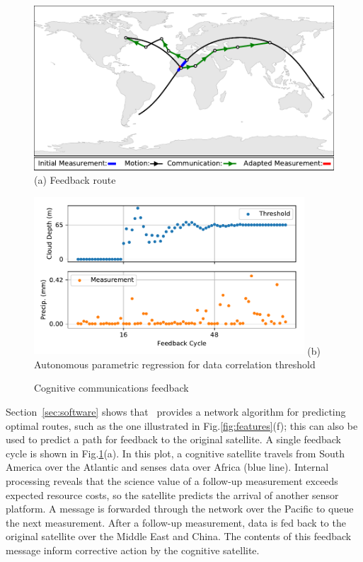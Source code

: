 \documentclass[conference]{IEEEtran}
\newcommand{\project}{{\sc{Collaborate}}~}
\begin{document}
\begin{figure}[b!]
  \begin{minipage}[b]{\linewidth}
    \begin{center}
      \includegraphics[width=\textwidth]{images/loop.pdf}
      {\footnotesize(a) Feedback route}
    \end{center}
  \end{minipage}
  \begin{minipage}[b]{\linewidth}
    \begin{center}
      \includegraphics[width=0.9\textwidth]{images/regression.pdf}
      {\footnotesize(b) Autonomous parametric regression for data correlation
        threshold}
    \end{center}
  \end{minipage}
  \caption{Cognitive communications feedback}
  \label{fig:feedback}
\end{figure}

Section~\ref{sec:software} shows that \project provides a network algorithm for predicting optimal routes, such as the one illustrated in Fig.\ref{fig:features}(f); this can also be used to predict a path for feedback to the original satellite.  A single feedback cycle is shown in Fig.\ref{fig:feedback}(a).  In this plot, a cognitive satellite travels from South America over the Atlantic and senses data over Africa (blue line).  Internal processing reveals that the science value of a follow-up measurement exceeds expected resource costs, so the satellite predicts the arrival of another sensor platform.  A message is forwarded through the network over the Pacific to queue the next measurement.  After a follow-up measurement, data is fed back to the original satellite over the Middle East and China.  The contents of this feedback message inform corrective action by the cognitive satellite.
\end{document}
